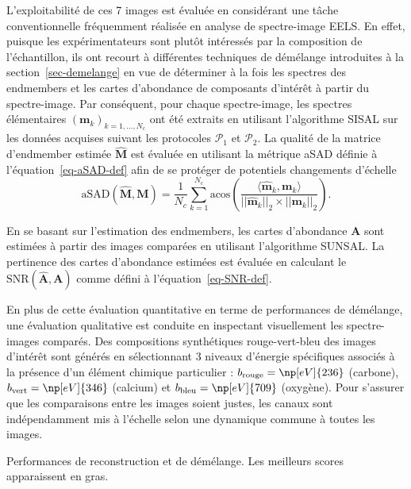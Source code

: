 L'exploitabilité de ces 7 images est évaluée en considérant une tâche conventionnelle fréquemment réalisée en analyse de spectre-image EELS. En effet, puisque les expérimentateurs sont plutôt intéressés par la composition de l'échantillon, ils ont recourt à différentes techniques de démélange introduites à la section~\ref{sec-demelange} en vue de déterminer à la fois les spectres des endmembers et les cartes d'abondance de composants d'intérêt à partir du spectre-image. Par conséquent, pour chaque spectre-image, les spectres élémentaires $(\mathbf{m}_k)_{k=1,\dots,N_c}$ ont été extraits en utilisant l'algorithme SISAL sur les données acquises suivant les protocoles $\mathcal{P}_1$ et $\mathcal{P}_2$. La qualité de la matrice d'endmember estimée $\hat{\mathbf{M}}$ est évaluée en utilisant la métrique aSAD définie à l'équation~\eqref{eq-aSAD-def} afin de se protéger de potentiels changements d'échelle
\begin{equation}
\mathrm{aSAD}(\hat{\mathbf{M}},\mathbf{M}) = \frac{1}{N_c}\sum_{k=1}^{N_c}\mathrm{acos}\left(
\frac
{\langle\hat{\mathbf{m}}_k, \mathbf{m}_k\rangle}
{||\hat{\mathbf{m}}_k||_2\times||\mathbf{m}_k||_2}
\right).
\end{equation}

En se basant sur l'estimation des endmembers, les cartes d'abondance $\mathbf{A}$ sont estimées à partir des images comparées en utilisant l'algorithme SUNSAL. La pertinence des cartes d'abondance estimées est évaluée en calculant le $\mathrm{SNR}(\hat{\mathbf{A}}, \mathbf{A})$ comme défini à l'équation~\eqref{eq-SNR-def}.

En plus de cette évaluation quantitative en terme de performances de démélange, une évaluation qualitative est conduite en inspectant visuellement les spectre-images comparés. Des compositions synthétiques rouge-vert-bleu des images d'intérêt sont générés en sélectionnant 3 niveaux d'énergie spécifiques associés à la présence d'un élément chimique particulier : $b_\mathrm{rouge} = \np[eV]{236}$ (carbone), $b_\mathrm{vert} = \np[eV]{346}$ (calcium) et $b_\mathrm{bleu} = \np[eV]{709}$ (oxygène). Pour s'assurer que les comparaisons entre les images soient justes, les canaux sont indépendamment mis à l'échelle selon une dynamique commune à toutes les images.

\begin{table}[]
    \centering
    \caption{Performances de reconstruction et de démélange. Les meilleurs scores apparaissent en gras.
        \protect\label{tab-lr-metrics}}
    
\end{table}

